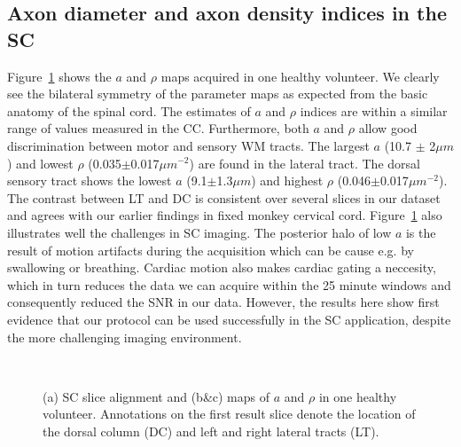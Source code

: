 \subsection*{Axon diameter and axon density indices in the SC}
Figure~\ref{fig:chap 9 SC results} shows the $a$ and $\rho$ maps acquired in one healthy volunteer. We clearly see the bilateral symmetry of the parameter maps as expected from the basic anatomy of the spinal cord. The estimates of $a$ and $\rho$ indices are within a similar range of values measured in the CC. Furthermore, both $a$ and $\rho$ allow good discrimination between motor and sensory WM tracts. The largest $a$ (10.7 $\pm$ 2$\mu m$) and lowest $\rho$ (0.035$\pm$0.017$\mu m^{-2}$) are found in the lateral tract. The dorsal sensory tract shows the lowest $a$ (9.1$\pm$1.3$\mu m$) and highest $\rho$ (0.046$\pm$0.017$\mu m^{-2}$). The contrast between LT and DC is consistent over several slices in our dataset and agrees with our earlier findings in fixed monkey cervical cord. Figure~\ref{fig:chap 9 SC results} also illustrates well the challenges in SC imaging. The posterior halo of low $a$ is the result of motion artifacts during the acquisition which can be cause e.g. by swallowing or breathing. Cardiac motion also makes cardiac gating a neccesity, which in turn reduces the data we can acquire within the 25 minute windows and consequently reduced the SNR in our data. However, the results here show first evidence that our \SFasym{} protocol can be used successfully in the SC application, despite the more challenging imaging environment.
\begin{figure}[ht]
	\centering
	\begin{minipage}{0.39\textwidth}
	\end{minipage}
	\begin{minipage}{0.59\textwidth}
			\\
	\end{minipage}
	\caption{(a) SC slice alignment  and  (b\&c) maps of $a$ and $\rho$ in one healthy volunteer. Annotations on the first result slice denote the location of the dorsal column (DC) and left and right lateral tracts (LT).}
	\label{fig:chap 9 SC results}
\end{figure}

